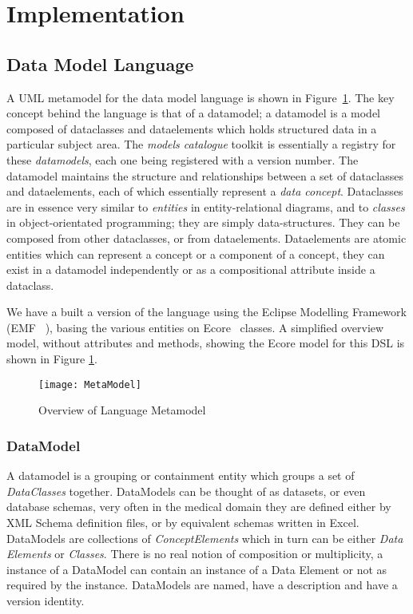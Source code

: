 \section{Implementation}

\subsection{Data Model Language}

A UML metamodel for the data model language is shown in
Figure~\ref{fig:mcSimplifiedOverview}. The key concept behind the language is that of a datamodel; a
datamodel is a model composed of dataclasses and dataelements which
holds structured data in a particular subject area. The \emph{models
  catalogue} toolkit is essentially a registry for these
\emph{datamodels}, each one being registered with a version
number. The datamodel maintains the structure and relationships
between a set of dataclasses and dataelements, each of which
essentially represent a \emph{data concept}. Dataclasses are in
essence very similar to \emph{entities} in entity-relational diagrams,
and to \emph{classes} in object-orientated programming; they are
simply data-structures. They can be composed from other dataclasses,
or from dataelements. Dataelements are atomic entities which can
represent a concept or a component of a concept, they can exist in a
datamodel independently or as a compositional attribute inside a
dataclass. 

We have a built a version of the language using the Eclipse Modelling
Framework (EMF ~\cite{EMF}), basing the various entities on
Ecore~\cite{ECORE} classes. A simplified overview model, without
attributes and methods, showing the Ecore model for this DSL is shown
in Figure \ref{fig:mcSimplifiedOverview}.


\begin{figure}[here]
  \texttt{[image: MetaModel]}
  \caption{Overview of Language Metamodel} 
  \label{fig:mcSimplifiedOverview}
\end{figure}

\subsubsection{DataModel}

A datamodel is a grouping or containment entity which groups a set of
\emph{DataClasses} together. DataModels can be thought of as datasets,
or even database schemas, very often in the medical domain they are
defined either by XML Schema definition files, or by equivalent
schemas written in Excel.  DataModels are collections of
\emph{ConceptElements} which in turn can be either \emph{Data
  Elements} or \emph{Classes}. There is no real notion of composition
or multiplicity, a instance of a DataModel can contain an instance of
a Data Element or not as required by the instance.  DataModels are
named, have a description and have a version identity.

